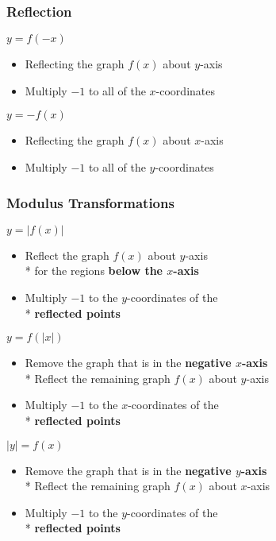 \documentclass[../main.tex]{subfiles}
\begin{document}
\subsubsection{Reflection}
\underline{\(y=f(-x)\)}
\begin{itemize}
    \item Reflecting the graph \(f(x)\) about \(y\)-axis
    \item Multiply \(-1\) to all of the \(x\)-coordinates
\end{itemize}
\underline{\(y=-f(x)\)}
\begin{itemize}
    \item Reflecting the graph \(f(x)\) about \(x\)-axis
    \item Multiply \(-1\) to all of the \(y\)-coordinates
\end{itemize}

\subsubsection{Modulus Transformations}
\underline{\(y=|f(x)|\)}
\begin{itemize}
    \item Reflect the graph \(f(x)\) about \(y\)-axis \\* for the regions \textbf{below the \(x\)-axis}
    \item Multiply \(-1\) to the \(y\)-coordinates of the \\* \textbf{reflected points}
\end{itemize}
\underline{\(y=f(|x|)\)}
\begin{itemize}
    \item Remove the graph that is in the \textbf{negative \(x\)-axis} \\* Reflect the remaining graph \(f(x)\) about \(y\)-axis
    \item Multiply \(-1\) to the \(x\)-coordinates of the \\* \textbf{reflected points}
\end{itemize}
\underline{\(|y|=f(x)\)}
\begin{itemize}
    \item Remove the graph that is in the \textbf{negative \(y\)-axis} \\* Reflect the remaining graph \(f(x)\) about \(x\)-axis
    \item Multiply \(-1\) to the \(y\)-coordinates of the \\* \textbf{reflected points}
\end{itemize}
\end{document}
